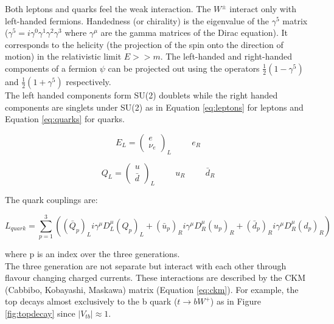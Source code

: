 Both leptons and quarks feel the weak interaction. The $W^{\pm}$ interact only
with left-handed fermions. Handedness (or chirality) is the eigenvalue of the 
$\gamma^{5}$ matrix ($\gamma^{5} = i\gamma^{0}\gamma^{1}\gamma^{2}\gamma^{3}$
where $\gamma^{\mu}$ are the gamma matrices of the Dirac equation). It 
corresponds to the helicity (the projection of the spin onto the direction of 
motion) in the relativistic limit $E >> m$. The left-handed and right-handed 
components of a fermion $\psi$ can be projected out using the operators 
$\frac{1}{2}(1 - \gamma^{5})$ and $\frac{1}{2}(1 + \gamma^{5})$ respectively. \\

The left handed components form SU(2) doublets while the right handed components
are singlets under SU(2) as in Equation \ref{eq:leptons} for leptons and
Equation \ref{eq:quarks} for quarks.

\begin{equation}
E_{L} = \left(\begin{array}{c}e\\\nu_{e}\end{array}\right)_{L} \hspace{1cm} e_{R}
\label{eq:leptons}
\end{equation}

\begin{equation}
Q_{L} = \left(\begin{array}{c}u\\\bar{d}\end{array}\right)_{L} \hspace{1cm}
u_{R} \hspace{1cm} \bar{d}_{R}
\label{eq:quarks}
\end{equation}

The quark couplings are:

\begin{equation}
L_{quark} = \displaystyle\sum\limits_{p=1}^3 \left( \left(\bar{Q}_{p}\right)_{L}
i\gamma^{\mu}D_{L}^{\mu} \left(Q_{p}\right)_{L} + \left(\bar{u}_{p}\right)_{R} 
i\gamma^{\mu}D_{R}^{\mu} \left(u_{p}\right)_{R} + \left(\bar{d}_{p}\right)_{R} 
i\gamma^{\mu}D_{R}^{\mu} \left(d_{p}\right)_{R} \right)
\label{eq:yukawa}
\end{equation}

where p is an index over the three generations. \\

The three generation are not separate but interact with each other through
flavour changing charged currents. These interactions are described by the CKM 
(Cabbibo, Kobayashi, Maskawa) matrix (Equation \ref{eq:ckm}). For example, the 
top decays almost exclusively to the b quark ($t\rightarrow bW^{+}$) as in 
Figure \ref{fig:topdecay} since $|V_{tb}| \approx 1$.

